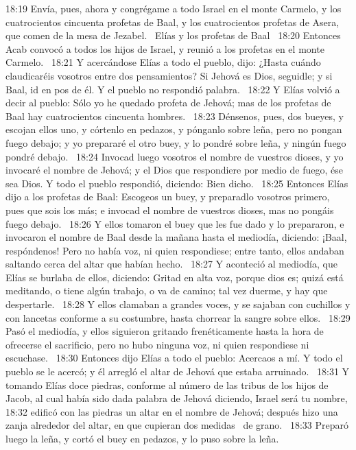 18:19 Envía, pues, ahora y congrégame a todo Israel en el monte Carmelo, y los cuatrocientos cincuenta profetas de Baal, y los cuatrocientos profetas de Asera, que comen de la mesa de Jezabel.  
Elías y los profetas de Baal  
18:20 Entonces Acab convocó a todos los hijos de Israel, y reunió a los profetas en el monte Carmelo.  
18:21 Y acercándose Elías a todo el pueblo, dijo: ¿Hasta cuándo claudicaréis vosotros entre dos pensamientos? Si Jehová es Dios, seguidle; y si Baal, id en pos de él. Y el pueblo no respondió palabra.  
18:22 Y Elías volvió a decir al pueblo: Sólo yo he quedado profeta de Jehová; mas de los profetas de Baal hay cuatrocientos cincuenta hombres.  
18:23 Dénsenos, pues, dos bueyes, y escojan ellos uno, y córtenlo en pedazos, y pónganlo sobre leña, pero no pongan fuego debajo; y yo prepararé el otro buey, y lo pondré sobre leña, y ningún fuego pondré debajo.  
18:24 Invocad luego vosotros el nombre de vuestros dioses, y yo invocaré el nombre de Jehová; y el Dios que respondiere por medio de fuego, ése sea Dios. Y todo el pueblo respondió, diciendo: Bien dicho.  
18:25 Entonces Elías dijo a los profetas de Baal: Escogeos un buey, y preparadlo vosotros primero, pues que sois los más; e invocad el nombre de vuestros dioses, mas no pongáis fuego debajo.  
18:26 Y ellos tomaron el buey que les fue dado y lo prepararon, e invocaron el nombre de Baal desde la mañana hasta el mediodía, diciendo: ¡Baal, respóndenos! Pero no había voz, ni quien respondiese; entre tanto, ellos andaban saltando cerca del altar que habían hecho.  
18:27 Y aconteció al mediodía, que Elías se burlaba de ellos, diciendo: Gritad en alta voz, porque dios es; quizá está meditando, o tiene algún trabajo, o va de camino; tal vez duerme, y hay que despertarle.  
18:28 Y ellos clamaban a grandes voces, y se sajaban con cuchillos y con lancetas conforme a su costumbre, hasta chorrear la sangre sobre ellos.  
18:29 Pasó el mediodía, y ellos siguieron gritando frenéticamente hasta la hora de ofrecerse el sacrificio, pero no hubo ninguna voz, ni quien respondiese ni escuchase.  
18:30 Entonces dijo Elías a todo el pueblo: Acercaos a mí. Y todo el pueblo se le acercó; y él arregló el altar de Jehová que estaba arruinado.  
18:31 Y tomando Elías doce piedras, conforme al número de las tribus de los hijos de Jacob, al cual había sido dada palabra de Jehová diciendo, Israel será tu nombre, 
18:32 edificó con las piedras un altar en el nombre de Jehová; después hizo una zanja alrededor del altar, en que cupieran dos medidas  de grano.  
18:33 Preparó luego la leña, y cortó el buey en pedazos, y lo puso sobre la leña.  
